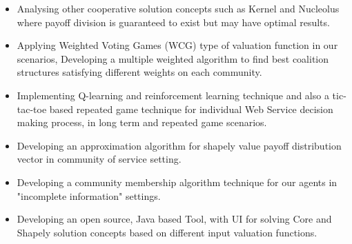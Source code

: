 \begin{itemize}
\item Analysing other cooperative solution concepts such as Kernel and Nucleolus where payoff division is guaranteed to exist but may have optimal results.
\item Applying Weighted Voting Games (WCG) type of valuation function in our scenarios, Developing a multiple weighted algorithm to find best coalition structures satisfying different weights on each community.
\item Implementing Q-learning and reinforcement learning technique and also a tic-tac-toe based repeated game technique for individual Web Service decision making process, in long term and repeated game scenarios.
\item Developing an approximation algorithm for shapely value payoff distribution vector in community of service setting.    
\item Developing a community membership algorithm technique for our agents in "incomplete information" settings.
\item Developing an open source, Java based Tool, with UI for solving Core and Shapely solution concepts based on different input valuation functions.
\end{itemize}


